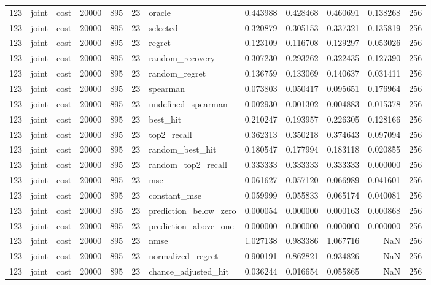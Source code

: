 \begin{tabular}{rllrrrlrrrrr}
123 & joint & cost & 20000 & 895 & 23 & oracle & 0.443988 & 0.428468 & 0.460691 & 0.138268 & 256 \\
123 & joint & cost & 20000 & 895 & 23 & selected & 0.320879 & 0.305153 & 0.337321 & 0.135819 & 256 \\
123 & joint & cost & 20000 & 895 & 23 & regret & 0.123109 & 0.116708 & 0.129297 & 0.053026 & 256 \\
123 & joint & cost & 20000 & 895 & 23 & random_recovery & 0.307230 & 0.293262 & 0.322435 & 0.127390 & 256 \\
123 & joint & cost & 20000 & 895 & 23 & random_regret & 0.136759 & 0.133069 & 0.140637 & 0.031411 & 256 \\
123 & joint & cost & 20000 & 895 & 23 & spearman & 0.073803 & 0.050417 & 0.095651 & 0.176964 & 256 \\
123 & joint & cost & 20000 & 895 & 23 & undefined_spearman & 0.002930 & 0.001302 & 0.004883 & 0.015378 & 256 \\
123 & joint & cost & 20000 & 895 & 23 & best_hit & 0.210247 & 0.193957 & 0.226305 & 0.128166 & 256 \\
123 & joint & cost & 20000 & 895 & 23 & top2_recall & 0.362313 & 0.350218 & 0.374643 & 0.097094 & 256 \\
123 & joint & cost & 20000 & 895 & 23 & random_best_hit & 0.180547 & 0.177994 & 0.183118 & 0.020855 & 256 \\
123 & joint & cost & 20000 & 895 & 23 & random_top2_recall & 0.333333 & 0.333333 & 0.333333 & 0.000000 & 256 \\
123 & joint & cost & 20000 & 895 & 23 & mse & 0.061627 & 0.057120 & 0.066989 & 0.041601 & 256 \\
123 & joint & cost & 20000 & 895 & 23 & constant_mse & 0.059999 & 0.055833 & 0.065174 & 0.040081 & 256 \\
123 & joint & cost & 20000 & 895 & 23 & prediction_below_zero & 0.000054 & 0.000000 & 0.000163 & 0.000868 & 256 \\
123 & joint & cost & 20000 & 895 & 23 & prediction_above_one & 0.000000 & 0.000000 & 0.000000 & 0.000000 & 256 \\
123 & joint & cost & 20000 & 895 & 23 & nmse & 1.027138 & 0.983386 & 1.067716 & NaN & 256 \\
123 & joint & cost & 20000 & 895 & 23 & normalized_regret & 0.900191 & 0.862821 & 0.934826 & NaN & 256 \\
123 & joint & cost & 20000 & 895 & 23 & chance_adjusted_hit & 0.036244 & 0.016654 & 0.055865 & NaN & 256 \\

\end{tabular}
